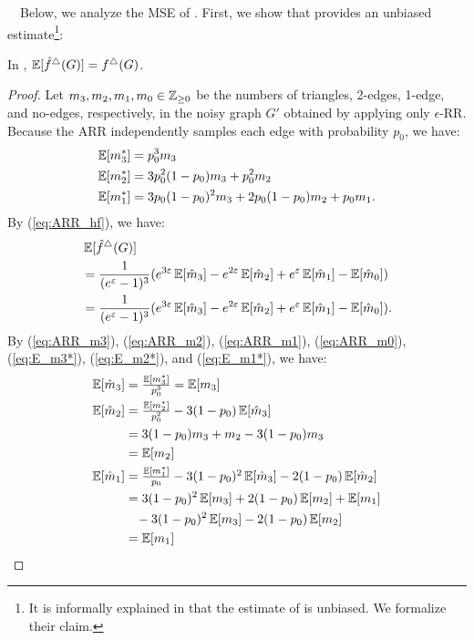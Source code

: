 \smallskip
{}~~Below, we analyze the MSE of \AlgARRTri{}.
First, we show that \AlgARRTri{} provides an unbiased estimate\footnote{It is informally explained in \cite{Imola_USENIX22} that the estimate of \AlgARRTri{} is unbiased. We formalize their claim.}:
\begin{theorem}
\label{thm:unbiased_ARR}
In \AlgARRTri{}, $\operatorname{\mathbb{E}}[\hat{f}^\triangle(G)] = f^\triangle(G)$.
\end{theorem}
\begin{proof}
Let $m_3, m_2, m_1, m_0 \in \mathbb{Z}_{\ge0}$ be the numbers of triangles, 2-edges, 1-edge, and no-edges, respectively, in the noisy graph $G'$ obtained by applying only $\epsilon$-RR.
Because the ARR independently samples each edge with probability $p_0$, we have:
\begin{align}
\operatorname{\mathbb{E}}[m_3^*] &= p_0^3 m_3 \label{eq:E_m3*}\\
\operatorname{\mathbb{E}}[m_2^*] &= 3 p_0^2 (1 - p_0) m_3 + p_0^2 m_2 \label{eq:E_m2*}\\
\operatorname{\mathbb{E}}[m_1^*] &= 3 p_0 (1 - p_0)^2 m_3 + 2 p_0 (1 - p_0) m_2 + p_0 m_1. \label{eq:E_m1*}
\end{align}
By (\ref{eq:ARR_hf}), we have:
\begin{align}
& \operatorname{\mathbb{E}}[\hat{f}^\triangle(G)] \nonumber\\
&= \frac{1}{(e^\varepsilon-1)^3}(e^{3\varepsilon} \operatorname{\mathbb{E}}[\hat{m}_3] - e^{2\varepsilon} \operatorname{\mathbb{E}}[\hat{m}_2] + e^\varepsilon \operatorname{\mathbb{E}}[\hat{m}_1] - \operatorname{\mathbb{E}}[\hat{m}_0]) \nonumber\\
&= \frac{1}{(e^\varepsilon-1)^3}(e^{3\varepsilon} \operatorname{\mathbb{E}}[\hat{m}_3] - e^{2\varepsilon} \operatorname{\mathbb{E}}[\hat{m}_2] + e^\varepsilon \operatorname{\mathbb{E}}[\hat{m}_1] - \operatorname{\mathbb{E}}[\hat{m}_0]). \label{eq:E_hf_triangle_G}
\end{align}
By (\ref{eq:ARR_m3}), (\ref{eq:ARR_m2}), (\ref{eq:ARR_m1}), (\ref{eq:ARR_m0}), (\ref{eq:E_m3*}), (\ref{eq:E_m2*}), and (\ref{eq:E_m1*}), we have:
\begin{align*}
\E[\hat{m}_3]
&= \textstyle{\frac{\E[m_3^*]}{p_0^3}}
= \E[m_3] \\
\E[\hat{m}_2]
&= \textstyle{\frac{\E[m_2^*]}{p_0^2} - 3(1-p_0)\E[\hat{m}_3]} \\
&= 3 (1 - p_0) m_3 + m_2 - 3(1-p_0)m_3 \\
&= \E[m_2] \\
\E[\hat{m}_1]
&= \textstyle{\frac{\E[m_1^*]}{p_0} - 3(1-p_0)^2\E[\hat{m}_3] - 2(1-p_0)\E[\hat{m}_2]} \\
&= 3 (1 - p_0)^2 \E[m_3] + 2 (1 - p_0) \E[m_2] + \E[m_1] \\
& \hspace{3mm} - 3(1-p_0)^2 \E[m_3] - 2(1-p_0) \E[m_2] \\ &= \E[m_1] \\

\end{align*}
\end{proof}
